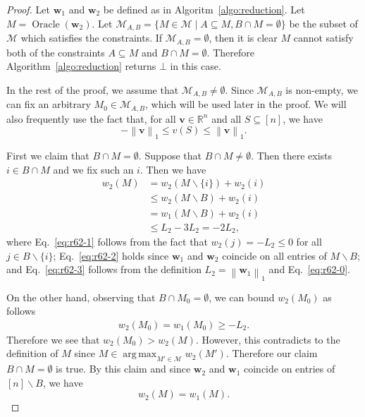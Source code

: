 \documentclass{article}
\newcommand{\M}{\mathcal M}
\newcommand{\del}{\backslash}
\newcommand{\RR}{\mathbb R}
\DeclareMathOperator*{\argmax}{arg\,max}
\DeclareMathOperator{\Oracle}{Oracle}
\newcommand{\nor}[1]{\left\|#1\right\|}
\renewcommand{\vec}[1]{\boldsymbol{#1}}
\begin{document}
\begin{proof}
Let $\vec w_1$ and $\vec w_2$ be defined as in Algoritm~\ref{algo:reduction}.
Let $M=\Oracle(\vec w_2)$.
Let $\M_{A,B} = \{M\in \M \mid A\subseteq M, B\cap M =\emptyset \}$ be the subset of $\M$ which satisfies the constraints.
If $\M_{A,B} = \emptyset$, then it is clear $M$ cannot satisfy both of the constraints $A \subseteq M$ and $B \cap M =\emptyset$. 
Therefore Algorithm~\ref{algo:reduction} returns $\bot$ in this case.

In the rest of the proof, we assume that $\M_{A,B} \not=\emptyset$. 
Since $\M_{A,B}$ is non-empty, we can fix an arbitrary $M_0 \in \M_{A,B}$, which will be used later in the proof. 
We will also frequently use the fact that, for all $\vec v\in \RR^{n}$ and all $S\subseteq[n]$, we have 
\begin{equation}
\label{eq:r62-0}
-\nor{\vec v}_1 \le v(S) \le \nor{\vec v}_1.
\end{equation}

First we claim that $B\cap M =\emptyset$.
Suppose that $B\cap M\not=\emptyset$. 
Then there exists $i\in B \cap M$ and we fix such an $i$.
Then we have
\begin{align}
	w_2(M) &= w_2(M\del \{i\})+w_2(i) \nonumber\\
				 &\le w_2(M \del B) + w_2(i) \label{eq:r62-1}\\
				 &= w_1(M\del B)+w_2(i) \label{eq:r62-2} \\
				 &\le L_2-3L_2 = -2L_2, \label{eq:r62-3}
\end{align}
where Eq.~\eqref{eq:r62-1} follows from the fact that $w_2(j) = -L_2 \le 0$ for all $j \in B \del \{i\}$;
Eq.~\eqref{eq:r62-2} holds since $\vec w_1$ and $\vec w_2$ coincide on all entries of $M\del B$;
and Eq.~\eqref{eq:r62-3} follows from the definition $L_2 = \nor{\vec w_1}_1$ and Eq.~\eqref{eq:r62-0}.

On the other hand, observing that $B\cap M_0=\emptyset$, we can bound $w_2(M_0)$ as follows
\begin{align*}
w_2(M_0) = w_1(M_0) \ge -L_2.
\end{align*}
Therefore we see that $w_2(M_0) > w_2(M)$.
However, this contradicts to the definition of $M$ since $M \in \argmax_{M'\in \M} w_2(M')$.
Therefore our claim $B\cap M = \emptyset$ is true.
By this claim and since $\vec w_2$ and $\vec w_1$ coincide on entries of $[n]\del B$, we have
\begin{equation}
\label{eq:rdc1}
w_2(M) = w_1(M).
\end{equation}


\end{proof}
\end{document}
